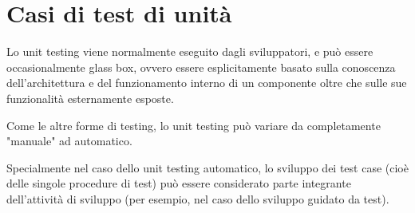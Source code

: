 \documentclass[../main.tex]{subfiles}
\begin{document}
\chapter{Casi di test di unità}
Lo unit testing viene normalmente eseguito dagli sviluppatori, e può essere occasionalmente glass box, ovvero essere esplicitamente basato sulla conoscenza dell'architettura e del funzionamento interno di un componente oltre che sulle sue funzionalità esternamente esposte.

Come le altre forme di testing, lo unit testing può variare da completamente "manuale" ad automatico.

Specialmente nel caso dello unit testing automatico, lo sviluppo dei test case (cioè delle singole procedure di test) può essere considerato parte integrante dell'attività di sviluppo (per esempio, nel caso dello sviluppo guidato da test).
\clearpage
\end{document}

